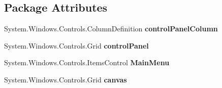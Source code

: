 \subsection*{Package Attributes}
\begin{DoxyCompactItemize}
\item 
\mbox{\label{class_teacher_handbook_1_1_u_i_1_1_windows_1_1_main_window_a3b9164942deb6814e75125f62869c7ca}} 
System.\+Windows.\+Controls.\+Column\+Definition {\bfseries control\+Panel\+Column}
\item 
\mbox{\label{class_teacher_handbook_1_1_u_i_1_1_windows_1_1_main_window_a0c339f60d9d61f768601b79e22b90fe5}} 
System.\+Windows.\+Controls.\+Grid {\bfseries control\+Panel}
\item 
\mbox{\label{class_teacher_handbook_1_1_u_i_1_1_windows_1_1_main_window_acedae577428afa3e671a0496e5f13f27}} 
System.\+Windows.\+Controls.\+Items\+Control {\bfseries Main\+Menu}
\item 
\mbox{\label{class_teacher_handbook_1_1_u_i_1_1_windows_1_1_main_window_a439ddf5fd2640224e38ee5bed18d68fc}} 
System.\+Windows.\+Controls.\+Grid {\bfseries canvas}
\end{DoxyCompactItemize}
